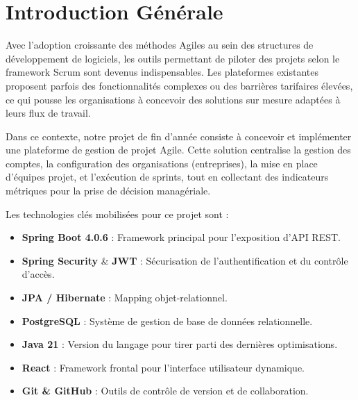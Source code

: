 \documentclass[12pt,a4paper]{report}
\begin{document}

\tableofcontents
\listoffigures
\listoftables


\chapter*{Introduction Générale}

Avec l'adoption croissante des méthodes Agiles au sein des structures de développement de logiciels, les outils permettant de piloter des projets selon le framework Scrum sont devenus indispensables. Les plateformes existantes proposent parfois des fonctionnalités complexes ou des barrières tarifaires élevées, ce qui pousse les organisations à concevoir des solutions sur mesure adaptées à leurs flux de travail.

Dans ce contexte, notre projet de fin d'année consiste à concevoir et implémenter une plateforme de gestion de projet Agile. Cette solution centralise la gestion des comptes, la configuration des organisations (entreprises), la mise en place d'équipes projet, et l'exécution de sprints, tout en collectant des indicateurs métriques pour la prise de décision managériale.

Les technologies clés mobilisées pour ce projet sont :
\begin{itemize}
\item \textbf{Spring Boot 4.0.6} : Framework principal pour l'exposition d'API REST.
\item \textbf{Spring Security} \& \textbf{JWT} : Sécurisation de l'authentification et du contrôle d'accès.
\item \textbf{JPA / Hibernate} : Mapping objet-relationnel.
\item \textbf{PostgreSQL} : Système de gestion de base de données relationnelle.
\item \textbf{Java 21} : Version du langage pour tirer parti des dernières optimisations.
\item \textbf{React} : Framework frontal pour l'interface utilisateur dynamique.
\item \textbf{Git \& GitHub} : Outils de contrôle de version et de collaboration.
\end{itemize}
\end{document}
